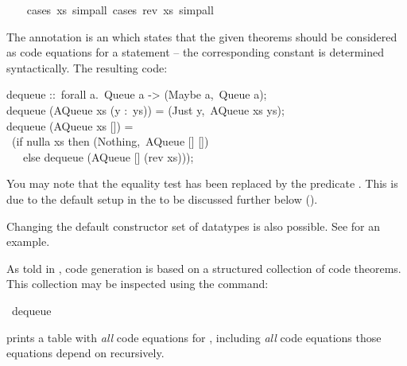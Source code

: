 \begin{isabellebody}
\ \ \isamarkupfalse%
\ {\isacharparenleft}cases\ xs{\isacharcomma}\ simp{\isacharunderscore}all{\isacharparenright}\ {\isacharparenleft}cases\ {\isachardoublequoteopen}rev\ xs{\isachardoublequoteclose}{\isacharcomma}\ simp{\isacharunderscore}all{\isacharparenright}%
\endisatagquote
{\isafoldquote}%
%
\isadelimquote
%
\endisadelimquote
%
\begin{isamarkuptext}%
\noindent The annotation  is an 
   which states that the given theorems should be
  considered as code equations for a  statement --
  the corresponding constant is determined syntactically.  The resulting code:%
\end{isamarkuptext}%
\isamarkuptrue%
%
\isadelimquote
%
\endisadelimquote
%
\isatagquote
%
\begin{isamarkuptext}%
\isatypewriter%
\noindent%
\hspace*{0pt}dequeue ::~forall a.~Queue a -> (Maybe a,~Queue a);\\
\hspace*{0pt}dequeue (AQueue xs (y :~ys)) = (Just y,~AQueue xs ys);\\
\hspace*{0pt}dequeue (AQueue xs []) =\\
\hspace*{0pt} ~(if nulla xs then (Nothing,~AQueue [] [])\\
\hspace*{0pt} ~~~else dequeue (AQueue [] (rev xs)));%
\end{isamarkuptext}%
\isamarkuptrue%
%
\endisatagquote
{\isafoldquote}%
%
\isadelimquote
%
\endisadelimquote
%
\begin{isamarkuptext}%
\noindent You may note that the equality test  has been
  replaced by the predicate .  This is due to the default
  setup in the  to be discussed further below ().

  Changing the default constructor set of datatypes is also
  possible.  See  for an example.

  As told in , code generation is based
  on a structured collection of code theorems.
  This collection
  may be inspected using the \hyperlink{command.code-thms}{\mbox{}} command:%
\end{isamarkuptext}%
\isamarkuptrue%
%
\isadelimquote
%
\endisadelimquote
%
\isatagquote
{}\isamarkupfalse%
\ dequeue%
\endisatagquote
{\isafoldquote}%
%
\isadelimquote
%
\endisadelimquote
%
\begin{isamarkuptext}%
\noindent prints a table with \emph{all} code equations
  for , including
  \emph{all} code equations those equations depend
  on recursively.
  

\end{isamarkuptext}
\end{isabellebody}
